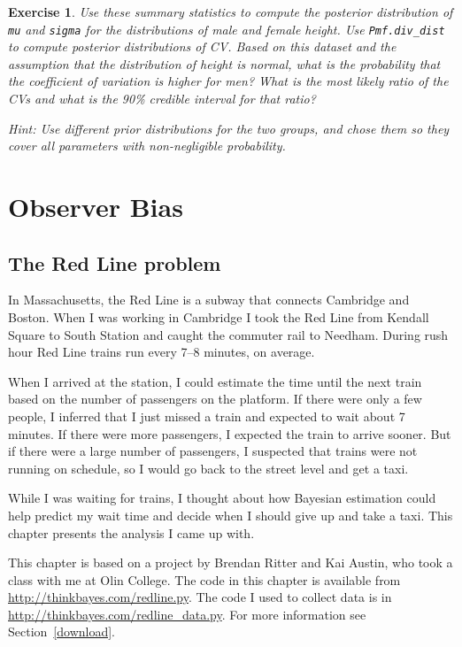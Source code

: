 \documentclass[12pt]{book}
\theoremstyle{exercise}
\newtheorem{exercise}{Exercise}[chapter]
\newcommand{\py}[1]{{\tt #1}}%
\begin{document}
\begin{exercise}
Use these summary statistics to compute the posterior distribution of
\py{mu} and \py{sigma} for the
distributions of male and female height. Use
\py{Pmf.div_dist} to compute posterior
distributions of CV. Based on this dataset and the assumption that the
distribution of height is normal, what is the probability that the
coefficient of variation is higher for men? What is the most likely
ratio of the CVs and what is the 90\% credible interval for that ratio?

Hint: Use different prior distributions for the two groups, and chose
them so they cover all parameters with non-negligible probability.

\end{exercise}


\chapter{Observer Bias}
\label{observer}

\section{The Red Line problem}

In Massachusetts, the Red Line is a subway that connects
Cambridge and Boston.  When I was working in Cambridge I took the Red
Line from Kendall Square to South Station and caught the commuter rail
to Needham.  During rush hour Red Line trains run every 7--8
minutes, on average.

When I arrived at the station, I could estimate the time until
the next train based on the number of passengers on the platform.
If there were only a few people, I inferred that I just missed
a train and expected to wait about 7 minutes.  If there were
more passengers, I expected the train to arrive sooner.  But if
there were a large number of passengers, I suspected that
trains were not running on schedule, so I would go back to the
street level and get a taxi.

While I was waiting for trains, I thought about how Bayesian
estimation could help predict my wait time and decide when I
should give up and take a taxi.  This chapter presents the
analysis I came up with.

This chapter is based on a project by Brendan Ritter and
Kai Austin, who took a class with me at Olin College.
The code in this chapter is available from
\url{http://thinkbayes.com/redline.py}.  The code I used
to collect data is in \url{http://thinkbayes.com/redline_data.py}.
  For more information
see Section~\ref{download}.
\end{document}

